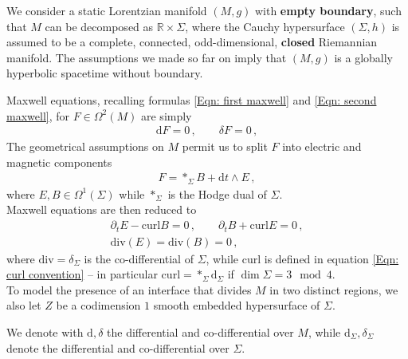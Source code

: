 We consider a static Lorentzian manifold $(M,g)$ with \textbf{empty boundary}, such that $M$ can be decomposed as $\mathbb{R}\times\Sigma$, where the Cauchy hypersurface $(\Sigma,h)$ is assumed to be a complete, connected, odd-dimensional, \textbf{closed} Riemannian manifold.
The assumptions we made so far on imply that $(M,g)$ is a globally hyperbolic spacetime without boundary.

Maxwell equations, recalling formulas \eqref{Eqn: first maxwell} and \eqref{Eqn: second maxwell}, for $F\in\Omega^2(M)$ are simply
\begin{align}\label{Eqn: covariant Maxwell equations}
\mathrm{d}F=0\,,\qquad\delta F=0\,,
\end{align}
The geometrical assumptions on $M$ permit us to split $F$ into electric and magnetic components
\begin{align}\label{Eqn: electric and magnetic components}
F=\ast_\Sigma B+\mathrm{d}t\wedge E\,,
\end{align}
where $E,B\in\Omega^1(\Sigma)$ while $\ast_\Sigma$ is the Hodge dual of $\Sigma$.\\
Maxwell equations are then reduced to
\begin{subequations}\label{Eqn: Maxwell equations}
	\begin{align}
	\label{Eqn: dynamical Maxwell equations}
	\partial_tE-\mathrm{curl}B=0\,,\qquad
	\partial_tB+\mathrm{curl}E=0\,,\\
	\label{Eqn: non-dynamical Maxwell equations}
	\mathrm{div}(E)=\mathrm{div}(B)=0\,,
	\end{align}
\end{subequations}
where $\mathrm{div}=\delta_\Sigma$ is the co-differential of $\Sigma$, while $\mathrm{curl}$ is defined in equation \eqref{Eqn: curl convention} -- in particular $\mathrm{curl}=\ast_\Sigma\mathrm{d}_\Sigma$ if $\dim\Sigma=3\mod 4$.\\
To model the presence of an interface that divides $M$ in two distinct regions, we also let $Z$ be a codimension $1$ smooth embedded hypersurface of $\Sigma$.

We denote with $\mathrm{d},\delta$ the differential and co-differential over $M$, while $\mathrm{d}_\Sigma,\delta_\Sigma$ denote the differential and co-differential over $\Sigma$.

